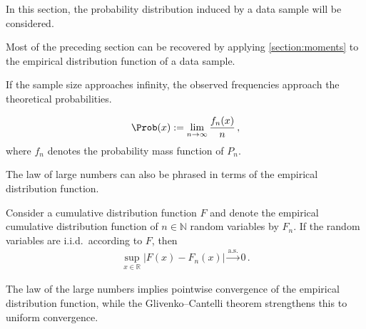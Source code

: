     In this section, the probability distribution induced by a data sample will be considered.

    \begin{remark}
        Most of the preceding section can be recovered by applying \cref{section:moments} to the empirical distribution function of a data sample.
    \end{remark}

    \begin{theorem}\label{statistics:large_numbers}
        If the sample size approaches infinity, the observed frequencies approach the theoretical probabilities.
    \end{theorem}
    \begin{result}
        \begin{gather}
            \label{statistics:frequentist_probability}
            \Prob(x) := \lim_{n\rightarrow\infty}\frac{f_n(x)}{n}\,,
        \end{gather}
        where $f_n$ denotes the probability mass function of $P_n$.
    \end{result}

    The law of large numbers can also be phrased in terms of the empirical distribution function.
    \begin{theorem}\label{statistics:glivenko_cantelli}
        Consider a cumulative distribution function $F$ and denote the empirical cumulative distribution function of $n\in\mathbb{N}$ random variables by $F_n$. If the random variables are i.i.d.~according to $F$, then
        \begin{gather}
            \sup_{x\in\mathbb{R}}|F(x)-F_n(x)|\overset{\text{a.s.}}{\longrightarrow}0\,.
        \end{gather}
    \end{theorem}
    \begin{remark}
        The law of the large numbers implies pointwise convergence of the empirical distribution function, while the Glivenko--Cantelli theorem strengthens this to uniform convergence.
    \end{remark}

